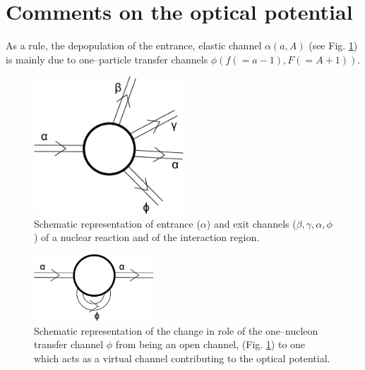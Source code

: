\section{Comments on the optical potential}\label{App2B}
As a rule, the depopulation of the entrance, elastic channel $\alpha (a,A)$ (see Fig. \ref{fig_2}) is mainly due to one--particle transfer channels $\phi (f(=a-1),F(=A+1))$.
\begin{figure}
\centerline{\includegraphics*[width=0.5\textwidth,angle=0]{nutshell/figs/fig_2.pdf}}
\caption{Schematic representation of entrance ($\alpha$) and exit channels ($\beta,\gamma,\alpha,\phi$)  of a nuclear reaction and of the interaction region.}\label{fig_2}
\end{figure}
\begin{figure}
\centerline{\includegraphics*[width=0.4\textwidth,angle=0]{nutshell/figs/fig_3.pdf}}
\caption{Schematic representation of the change in role of the one--nucleon transfer channel $\phi$ from being an open channel, (Fig. \ref{fig_2}) to one which acts as a virtual channel contributing to the optical potential.}\label{fig_3}
\end{figure}
